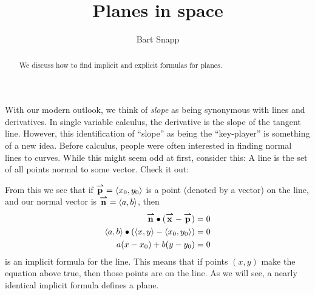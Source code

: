 \documentclass{ximera}
\author{Bart Snapp}
\title[Dig-In:]{Planes in space}
\begin{document}
\begin{abstract}
  We discuss how to find implicit and explicit formulas for planes.
\end{abstract}
\maketitle


With our modern outlook, we think of \textit{slope} as being
synonymous with lines and derivatives. In single variable calculus,
the derivative is the slope of the tangent line. However, this
identification of ``slope'' as being the ``key-player'' is something
of a new idea. Before calculus, people were often interested in
finding normal lines to curves. While this might seem odd at first,
consider this: A line is the set of all points normal to some vector.
Check it out:
\begin{image}
\end{image}
From this we see that if ${\overset{\boldsymbol{\rightharpoonup}}{\mathbf{p}}}=\left\langle x_0,y_0\right\rangle$ is a point
(denoted by a vector) on the line, and our normal vector is
${\overset{\boldsymbol{\rightharpoonup}}{\mathbf{n}}}=\left\langle a,b\right\rangle$, then
\begin{align*}
  {\overset{\boldsymbol{\rightharpoonup}}{\mathbf{n}}}\bullet({\overset{\boldsymbol{\rightharpoonup}}{\mathbf{x}}}-{\overset{\boldsymbol{\rightharpoonup}}{\mathbf{p}}}) &=0\\
  \left\langle a,b\right\rangle\bullet(\left\langle x,y\right\rangle- \left\langle x_0,y_0\right\rangle) &= 0\\
  a(x-x_0)+ b(y-y_0) &= 0
\end{align*}
is an implicit formula for the line. This means that if points $(x,y)$
make the equation above true, then those points are on the line. As we
will see, a nearly identical implicit formula defines a plane.
\end{document}
